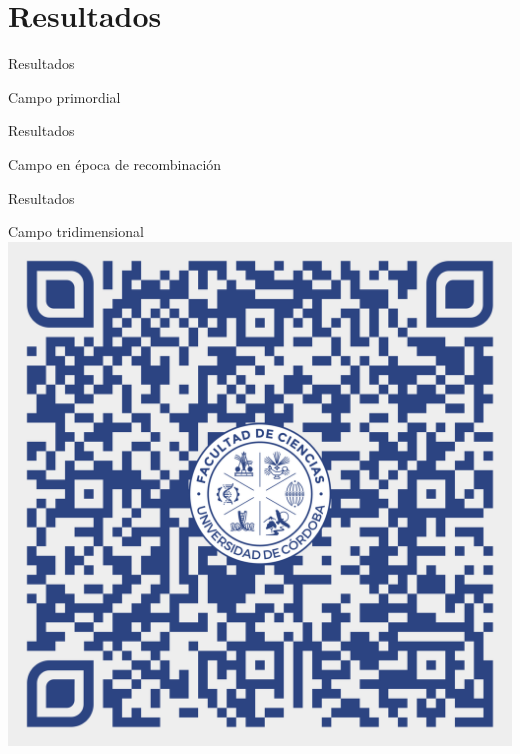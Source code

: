 \section{Resultados}
\begin{frame}[noframenumbering]{Resultados}
    \begin{block}{Campo primordial}
        \centering
        \scalebox{.62}{}
    \end{block}
\end{frame}
\begin{frame}{Resultados}
    \begin{block}{Campo en época de recombinación}
        \centering
        \scalebox{.62}{}
    \end{block}
\end{frame}
\begin{frame}{Resultados}
    \begin{block}{Campo tridimensional}
        \centering
        \href{https://rafaariza.github.io/rafaariza/assets/images/FS2029FSC.gif}{\includegraphics[scale=.08]{../svg/qrgifslides.pdf}}
    \end{block}
\end{frame}
